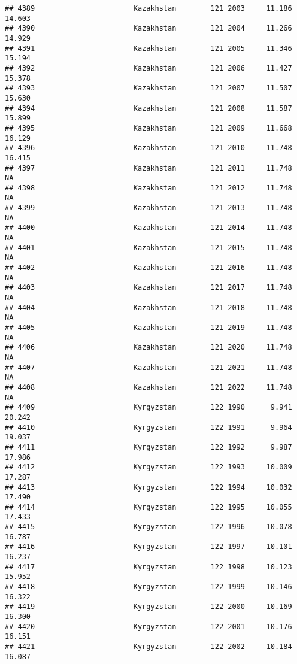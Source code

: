 \documentclass[
]{article}
\begin{document}
\begin{verbatim}
## 4389                       Kazakhstan        121 2003     11.186     14.603
## 4390                       Kazakhstan        121 2004     11.266     14.929
## 4391                       Kazakhstan        121 2005     11.346     15.194
## 4392                       Kazakhstan        121 2006     11.427     15.378
## 4393                       Kazakhstan        121 2007     11.507     15.630
## 4394                       Kazakhstan        121 2008     11.587     15.899
## 4395                       Kazakhstan        121 2009     11.668     16.129
## 4396                       Kazakhstan        121 2010     11.748     16.415
## 4397                       Kazakhstan        121 2011     11.748         NA
## 4398                       Kazakhstan        121 2012     11.748         NA
## 4399                       Kazakhstan        121 2013     11.748         NA
## 4400                       Kazakhstan        121 2014     11.748         NA
## 4401                       Kazakhstan        121 2015     11.748         NA
## 4402                       Kazakhstan        121 2016     11.748         NA
## 4403                       Kazakhstan        121 2017     11.748         NA
## 4404                       Kazakhstan        121 2018     11.748         NA
## 4405                       Kazakhstan        121 2019     11.748         NA
## 4406                       Kazakhstan        121 2020     11.748         NA
## 4407                       Kazakhstan        121 2021     11.748         NA
## 4408                       Kazakhstan        121 2022     11.748         NA
## 4409                       Kyrgyzstan        122 1990      9.941     20.242
## 4410                       Kyrgyzstan        122 1991      9.964     19.037
## 4411                       Kyrgyzstan        122 1992      9.987     17.986
## 4412                       Kyrgyzstan        122 1993     10.009     17.287
## 4413                       Kyrgyzstan        122 1994     10.032     17.490
## 4414                       Kyrgyzstan        122 1995     10.055     17.433
## 4415                       Kyrgyzstan        122 1996     10.078     16.787
## 4416                       Kyrgyzstan        122 1997     10.101     16.237
## 4417                       Kyrgyzstan        122 1998     10.123     15.952
## 4418                       Kyrgyzstan        122 1999     10.146     16.322
## 4419                       Kyrgyzstan        122 2000     10.169     16.300
## 4420                       Kyrgyzstan        122 2001     10.176     16.151
## 4421                       Kyrgyzstan        122 2002     10.184     16.087

\end{verbatim}
\end{document}
